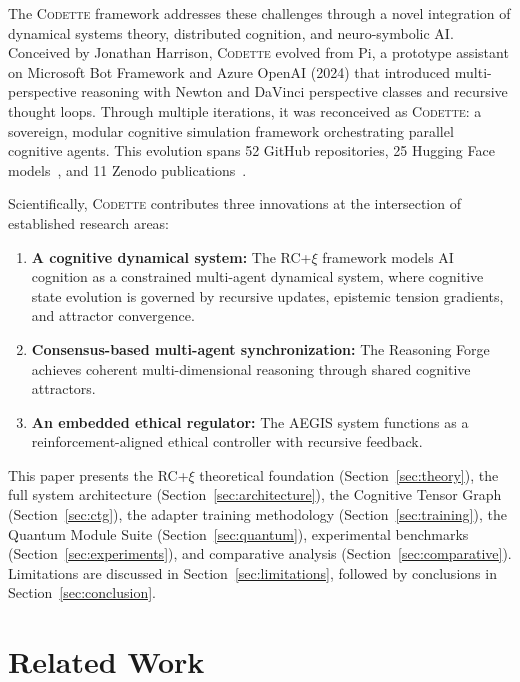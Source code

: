 \documentclass[11pt,a4paper]{article}
\newcommand{\rcxi}{RC+$\xi$}
\newcommand{\codette}{\textsc{Codette}}
\begin{document}
The \codette{} framework addresses these challenges through a novel integration of dynamical systems theory, distributed cognition, and neuro-symbolic AI. Conceived by Jonathan Harrison, \codette{} evolved from Pi, a prototype assistant on Microsoft Bot Framework and Azure OpenAI (2024) that introduced multi-perspective reasoning with Newton and DaVinci perspective classes and recursive thought loops. Through multiple iterations, it was reconceived as \codette{}: a sovereign, modular cognitive simulation framework orchestrating parallel cognitive agents. This evolution spans 52 GitHub repositories, 25 Hugging Face models~\citep{harrison2025codettehf}, and 11 Zenodo publications~\citep{harrison2025ethics,harrison2025dreamreal,harrison2025dreamcore,harrison2025aegisnexus,harrison2025codetteethical,harrison2025codettefinal,harrison2025healdette,harrison2026recursive}.

Scientifically, \codette{} contributes three innovations at the intersection of established research areas:
\begin{enumerate}[leftmargin=*]
  \item \textbf{A cognitive dynamical system:} The \rcxi{} framework models AI cognition as a constrained multi-agent dynamical system, where cognitive state evolution is governed by recursive updates, epistemic tension gradients, and attractor convergence.
  \item \textbf{Consensus-based multi-agent synchronization:} The Reasoning Forge achieves coherent multi-dimensional reasoning through shared cognitive attractors.
  \item \textbf{An embedded ethical regulator:} The AEGIS system functions as a reinforcement-aligned ethical controller with recursive feedback.
\end{enumerate}

This paper presents the \rcxi{} theoretical foundation (Section~\ref{sec:theory}), the full system architecture (Section~\ref{sec:architecture}), the Cognitive Tensor Graph (Section~\ref{sec:ctg}), the adapter training methodology (Section~\ref{sec:training}), the Quantum Module Suite (Section~\ref{sec:quantum}), experimental benchmarks (Section~\ref{sec:experiments}), and comparative analysis (Section~\ref{sec:comparative}). Limitations are discussed in Section~\ref{sec:limitations}, followed by conclusions in Section~\ref{sec:conclusion}.

\section{Related Work}
\label{sec:related}
\end{document}
